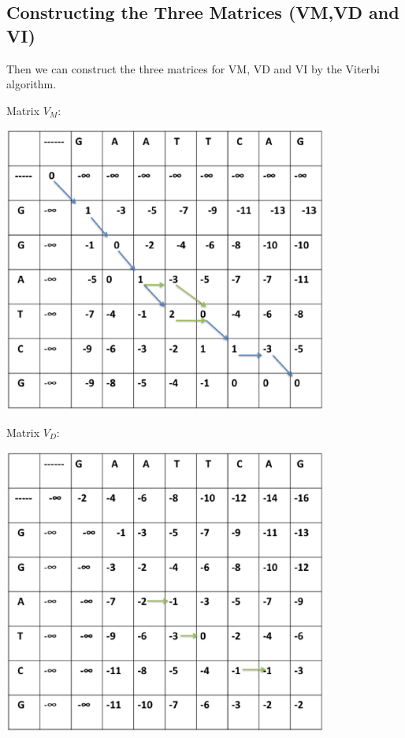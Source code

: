 \documentclass[english, a4paper,11pt]{article}
\begin{document}
\subsection{Constructing the Three Matrices (VM,VD and VI)}

Then we can construct the three matrices for VM, VD and VI by the Viterbi algorithm.

Matrix $V_M$:
\begin{center}
\includegraphics[width=0.8\textwidth]{Slide1.eps}
\end{center}

\newpage
Matrix $V_D$:
\begin{center}
\includegraphics[width=0.8\textwidth]{Slide2.eps}
\end{center}
\end{document}
